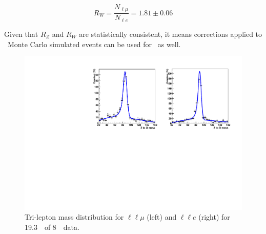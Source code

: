 \begin{equation}
    R_W = \frac{N_{\ell\mu}}{N_{\ell e}} = 1.81\pm0.06
\end{equation}

Given that $R_Z$ and $R_W$ are statistically consistent, it means
corrections applied to \WgstarMM\ Monte Carlo simulated events can be
used for \WgstarEE\ as well.

\begin{figure}[!hbtp]
\centering
\includegraphics[width=.75\textwidth]{figures/appendix_zgstar_data.pdf}
\caption{Tri-lepton mass distribution for $\ell\ell\mu$ (left) and 
$\ell\ell e$ (right) for 19.3~\ifb\ of 8~\TeV\ data.}
\label{fig:appendix_zgstar_data}
\end{figure}

